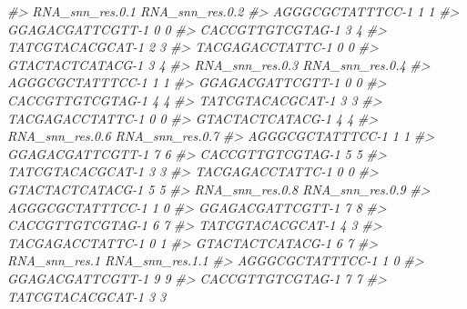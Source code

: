 \documentclass[
]{book}
\newenvironment{Shaded}{\begin{snugshade}}{\end{snugshade}}
\newcommand{\CommentTok}[1]{\textcolor[rgb]{0.56,0.35,0.01}{\textit{#1}}}
\begin{document}
\begin{Shaded}
\begin{Highlighting}[]
\CommentTok{\#\textgreater{}                  RNA\_snn\_res.0.1 RNA\_snn\_res.0.2}
\CommentTok{\#\textgreater{} AGGGCGCTATTTCC{-}1               1               1}
\CommentTok{\#\textgreater{} GGAGACGATTCGTT{-}1               0               0}
\CommentTok{\#\textgreater{} CACCGTTGTCGTAG{-}1               3               4}
\CommentTok{\#\textgreater{} TATCGTACACGCAT{-}1               2               3}
\CommentTok{\#\textgreater{} TACGAGACCTATTC{-}1               0               0}
\CommentTok{\#\textgreater{} GTACTACTCATACG{-}1               3               4}
\CommentTok{\#\textgreater{}                  RNA\_snn\_res.0.3 RNA\_snn\_res.0.4}
\CommentTok{\#\textgreater{} AGGGCGCTATTTCC{-}1               1               1}
\CommentTok{\#\textgreater{} GGAGACGATTCGTT{-}1               0               0}
\CommentTok{\#\textgreater{} CACCGTTGTCGTAG{-}1               4               4}
\CommentTok{\#\textgreater{} TATCGTACACGCAT{-}1               3               3}
\CommentTok{\#\textgreater{} TACGAGACCTATTC{-}1               0               0}
\CommentTok{\#\textgreater{} GTACTACTCATACG{-}1               4               4}
\CommentTok{\#\textgreater{}                  RNA\_snn\_res.0.6 RNA\_snn\_res.0.7}
\CommentTok{\#\textgreater{} AGGGCGCTATTTCC{-}1               1               1}
\CommentTok{\#\textgreater{} GGAGACGATTCGTT{-}1               7               6}
\CommentTok{\#\textgreater{} CACCGTTGTCGTAG{-}1               5               5}
\CommentTok{\#\textgreater{} TATCGTACACGCAT{-}1               3               3}
\CommentTok{\#\textgreater{} TACGAGACCTATTC{-}1               0               0}
\CommentTok{\#\textgreater{} GTACTACTCATACG{-}1               5               5}
\CommentTok{\#\textgreater{}                  RNA\_snn\_res.0.8 RNA\_snn\_res.0.9}
\CommentTok{\#\textgreater{} AGGGCGCTATTTCC{-}1               1               0}
\CommentTok{\#\textgreater{} GGAGACGATTCGTT{-}1               7               8}
\CommentTok{\#\textgreater{} CACCGTTGTCGTAG{-}1               6               7}
\CommentTok{\#\textgreater{} TATCGTACACGCAT{-}1               4               3}
\CommentTok{\#\textgreater{} TACGAGACCTATTC{-}1               0               1}
\CommentTok{\#\textgreater{} GTACTACTCATACG{-}1               6               7}
\CommentTok{\#\textgreater{}                  RNA\_snn\_res.1 RNA\_snn\_res.1.1}
\CommentTok{\#\textgreater{} AGGGCGCTATTTCC{-}1             1               0}
\CommentTok{\#\textgreater{} GGAGACGATTCGTT{-}1             9               9}
\CommentTok{\#\textgreater{} CACCGTTGTCGTAG{-}1             7               7}
\CommentTok{\#\textgreater{} TATCGTACACGCAT{-}1             3               3}

\end{Highlighting}
\end{Shaded}
\end{document}
